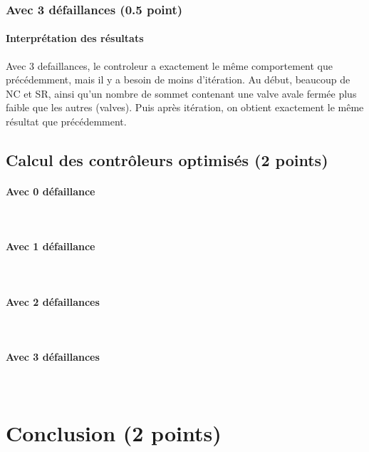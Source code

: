 \documentclass[a4paper]{book}
\begin{document}
\subsubsection{Avec 3 défaillances (0.5 point)}




%
\paragraph{Interprétation des résultats}
Avec 3 defaillances, le controleur a exactement le même comportement que précédemment, mais il y a besoin de moins d'itération. 
Au début, beaucoup de NC et SR, ainsi qu'un nombre de sommet contenant une valve avale fermée plus faible que les autres (valves).
Puis après itération, on obtient exactement le même résultat que précédemment.

\subsection{Calcul des contrôleurs optimisés (2 points)}
\paragraph{Avec 0 défaillance}\ \\


\paragraph{Avec 1 défaillance}\ \\


\paragraph{Avec 2 défaillances}\ \\


\paragraph{Avec 3 défaillances}\ \\


\section{Conclusion (2 points)}
\end{document}
